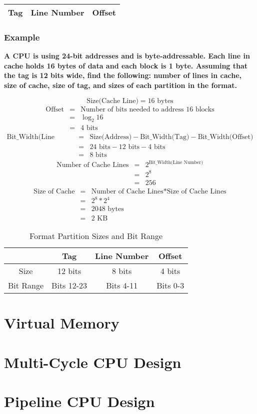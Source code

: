 \documentclass[11pt]{article}
\begin{document}
\begin{table}[H]
	\centering
	\begin{tabular}{| c | c | c |}
		\hline
		Tag		&	Line Number		&		 Offset\\
		\hline
	\end{tabular}
\end{table}

\subsubsection{Example}

\textbf{A CPU is using 24-bit addresses and is byte-addressable. Each line in cache holds 16 bytes of data and each block is 1 byte. Assuming that the tag is 12 bits wide, find the following: number of lines in cache, size of cache, size of tag, and sizes of each partition in the format.}

\[
\text{Size(Cache Line)} = 16 \text{ bytes}
\]
\begin{eqnarray*}
	\text{Offset} &=& \text{Number of bits needed to address 16 blocks}\\
		&=& \log_2 16\\
		&=& 4 \text{ bits}
\end{eqnarray*}
\begin{eqnarray*}
\text{Bit\_Width(Line Number)} &=& \text{Size(Address)} - \text{Bit\_Width(Tag)} - \text{Bit\_Width(Offset)}\\
	&=& 24 \text{ bits} - 12 \text{ bits} - 4 \text{ bits}\\
	&=& 8 \text{ bits}
\end{eqnarray*}
\begin{eqnarray*}
	\text{Number of Cache Lines} &=& 2^\text{Bit\_Width(Line Number)}\\
		&=& 2^8\\
		&=& 256
\end{eqnarray*}
\begin{eqnarray*}
	\text{Size of Cache} &=& \text{Number of Cache Lines} * \text{Size of Cache Lines}\\
		&=& 2^8 * 2^4\\
		&=& 2048 \text{ bytes}\\
		&=& 2 \text{ KB}
\end{eqnarray*}

\begin{table}[H]
	\centering
	\caption*{Format Partition Sizes and Bit Range}
	\begin{tabular}{| c | c | c | c |}
		\hline
					&	Tag		&	Line Number		&	Offset\\
		\hline
		Size		&	12 bits	&	8 bits			&	4 bits\\
		\hline
		Bit Range	&	Bits 12-23	&	Bits 4-11	&	Bits 0-3\\
		\hline
	\end{tabular}
\end{table}

\section{Virtual Memory}

\section{Multi-Cycle CPU Design}

\section{Pipeline CPU Design}
\end{document}
